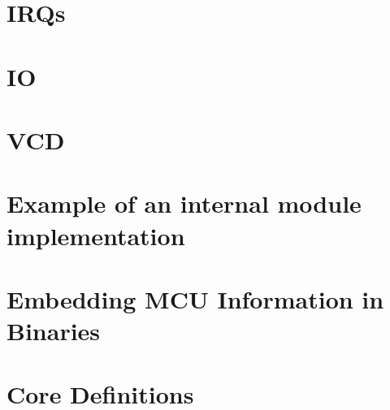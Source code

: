 \section{IRQs}
\section{IO}
\section{VCD}
\section{Example of an internal module implementation} %
\section{Embedding MCU Information in Binaries}
\section{Core Definitions}

